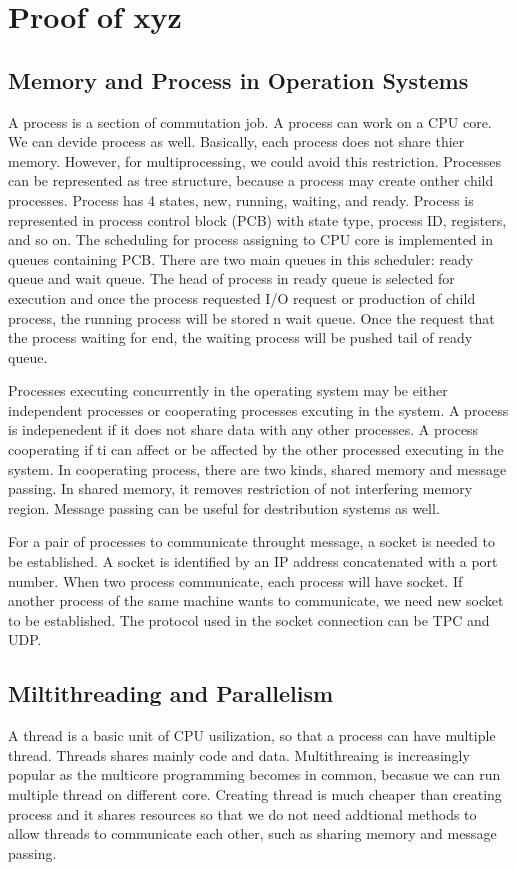 \chapter{Proof of xyz}
\label{appendix}
\thispagestyle{myheadings}

\section{Memory and Process in Operation Systems}
\label{sec:history}
A process is a section of commutation job. A process can work on a CPU core. We can devide process as well.
Basically, each process does not share thier memory. However, for multiprocessing, we could avoid this restriction.
Processes can be represented as tree structure, because a process may create onther child processes.
Process has 4 states, new, running, waiting, and ready. 
Process is represented in process control block (PCB) with state type, process ID, registers, and so on.
The scheduling for process assigning to CPU core is implemented in queues containing PCB. There are two main queues in this scheduler: 
ready queue and wait queue. The head of process in ready queue is selected for execution and once the process requested I/O request or 
production of child process, the running process will be stored n wait queue. Once the request that the process waiting for end, 
the waiting process will be pushed tail of ready queue. 

Processes executing concurrently in the operating system may be either independent processes or cooperating processes excuting in the system.
A process is indepenedent if it does not share data with any other processes. A process cooperating if ti can affect or be affected by the 
other processed executing in the system. In cooperating process, there are two kinds, shared memory and message passing. 
In shared memory, it removes restriction of not interfering memory region. Message passing can be useful for destribution systems as well.

For a pair of processes to communicate throught message, a socket is needed to be established. 
A socket is identified by an IP address concatenated with a port number. When two process communicate, each process will have socket. 
If another process of the same machine wants to communicate, we need new socket to be established. The protocol used in the socket connection
can be TPC and UDP.


\section{Miltithreading and Parallelism}
\label{sec:history}
A thread is a basic unit of CPU usilization, so that a process can have multiple thread. Threads shares mainly code and data. 
Multithreaing is increasingly popular as the multicore programming becomes in common, becasue we can run multiple thread on different core.
Creating thread is much cheaper than creating process and it shares resources so that we do not need addtional methods to allow threads to 
communicate each other, such as sharing memory and message passing.

